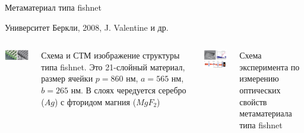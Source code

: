 \documentclass[9pt, compress, xcolor=table]{beamer}
\begin{document}
\begin{frame}{Метаматериал типа fishnet}

{\scriptsize Университет Беркли, 2008, J. Valentine и др.}

\begin{columns}[c]
\column{6cm}
\begin{center}
\includegraphics[width=5cm]{neg_ref_24}
\end{center}
 Схема и СТМ изображение структуры типа fishnet. Это 21-слойный материал, размер ячейки
$p=860$ нм, $a=565$ нм, $b = 265$ нм. В слоях чередуется серебро ($Ag$) с фторидом магния
($MgF_2$)

\column{6cm}
\begin{center}
\includegraphics[width=5cm]{neg_ref_25}
\end{center}

 Схема эксперимента по измерению оптических свойств метаматериала типа fishnet
\end{columns}
\end{frame}
\end{document}
